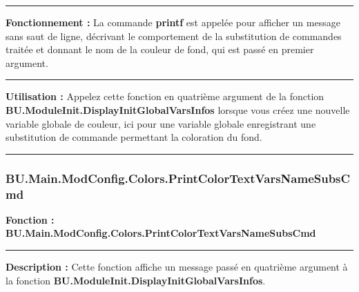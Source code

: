 \documentclass[a4paper,10pt]{article}
\begin{document}

    \par\noindent\rule{\textwidth}{0.4pt}

    \begin{justify}
        \textbf{Fonctionnement :} La commande \textbf{\color{cmds}printf} est appelée pour afficher un message sans saut de ligne, décrivant le comportement de la substitution de commandes traitée et donnant le nom de la couleur de fond, qui est passé en premier argument.
    \end{justify}


    \par\noindent\rule{\textwidth}{0.4pt}

    \begin{justify}
        \textbf{Utilisation :} Appelez cette fonction en quatrième argument de la fonction \textbf{\color{func}BU.ModuleInit.DisplayInitGlobalVarsInfos} lorsque vous créez une nouvelle variable globale de couleur, ici pour une variable globale enregistrant une substitution de commande permettant la coloration du fond.
    \end{justify}



    \color{sec3}\par\noindent\rule{\textwidth}{0.4pt}\color{text}

    \color{sec3}
    \subsubsection{BU.Main.ModConfig.Colors.PrintColorTextVarsNameSubsCmd}\color{text}

    \begin{justify}
        \textbf{Fonction : \color{func}BU.Main.ModConfig.Colors.PrintColorTextVarsNameSubsCmd}
    \end{justify}


    \par\noindent\rule{\textwidth}{0.4pt}

    \begin{justify}
        \textbf{Description :} Cette fonction affiche un message passé en quatrième argument à la fonction \textbf{\color{func}BU.ModuleInit.DisplayInitGlobalVarsInfos}.
    \end{justify}
\end{document}
